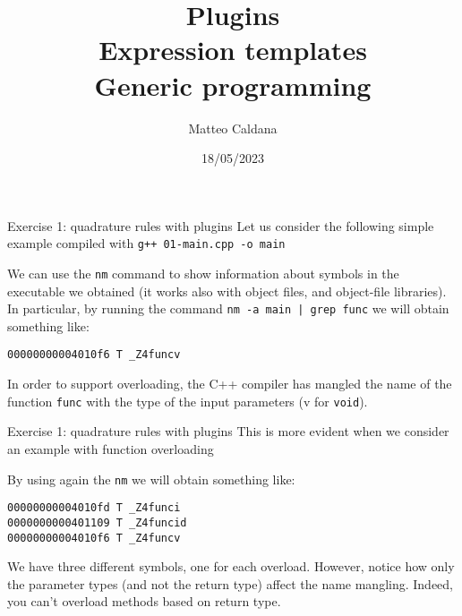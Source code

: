 \documentclass[10pt,aspectratio=169]{beamer}
\begin{document}
    \title{Plugins \protect\\ Expression templates \protect\\ Generic programming}
    \author{Matteo Caldana}
    \date{18/05/2023}

\begin{frame}
    \maketitle
\end{frame}

\begin{frame}[fragile]{Exercise 1: quadrature rules with plugins}
    Let us consider the following simple example compiled with \texttt{g++ 01-main.cpp -o main}
    
    \vfill
    We can use the \texttt{nm} command to show information about symbols in the executable we obtained (it works also with object files, and object-file libraries). In particular, by running the command \texttt{nm -a main | grep func} we will obtain something like:
    
\begin{verbatim}
00000000004010f6 T _Z4funcv
\end{verbatim}

In order to support overloading, the C++ compiler has mangled the name of the function \texttt{func} with the type of the input parameters (v for \texttt{void}).

\end{frame}

\begin{frame}[fragile]{Exercise 1: quadrature rules with plugins}
    This is more evident when we consider an example with function overloading
    
    \vfill
    By using again the \texttt{nm} we will obtain something like:
    
\begin{verbatim}
00000000004010fd T _Z4funci
0000000000401109 T _Z4funcid
00000000004010f6 T _Z4funcv
\end{verbatim}

We have three different symbols, one for each overload. However, notice how only the parameter types (and not the return type) affect the name mangling. Indeed, you can't overload methods based on return type.

\end{frame}
    
\end{document}
